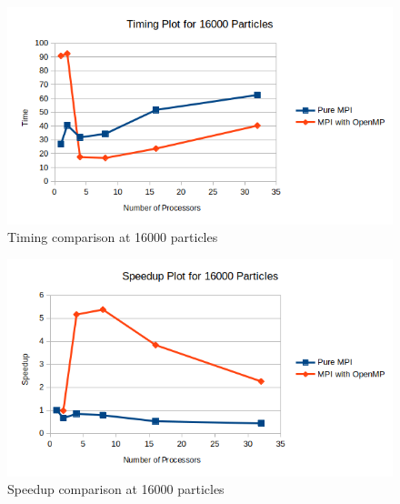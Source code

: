\documentclass{article}
\begin{document}
\begin{figure}[H]
	\begin{center}
		\hspace*{-0.5cm}                                                           
  		\includegraphics[scale=0.7]{Report_Assets/timing16000.png}
  	\end{center}
  	\caption{Timing comparison at 16000 particles}
\end{figure}

\begin{figure}[H]
	\begin{center}
		\hspace*{-0.5cm}                                                           
  		\includegraphics[scale=0.7]{Report_Assets/speedup16000.png}
  	\end{center}
  	\caption{Speedup comparison at 16000 particles}
\end{figure}
\end{document}
